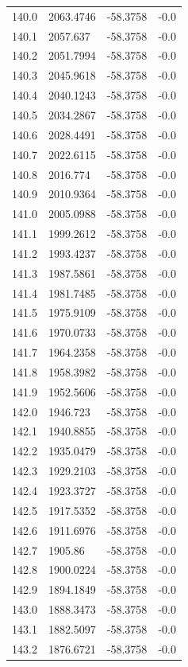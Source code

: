 \begin{table}[H]
\begin{tabular}{llll}
140.0 & 2063.4746 & -58.3758 & -0.0 \\
140.1 & 2057.637 & -58.3758 & -0.0 \\
140.2 & 2051.7994 & -58.3758 & -0.0 \\
140.3 & 2045.9618 & -58.3758 & -0.0 \\
140.4 & 2040.1243 & -58.3758 & -0.0 \\
140.5 & 2034.2867 & -58.3758 & -0.0 \\
140.6 & 2028.4491 & -58.3758 & -0.0 \\
140.7 & 2022.6115 & -58.3758 & -0.0 \\
140.8 & 2016.774 & -58.3758 & -0.0 \\
140.9 & 2010.9364 & -58.3758 & -0.0 \\
141.0 & 2005.0988 & -58.3758 & -0.0 \\
141.1 & 1999.2612 & -58.3758 & -0.0 \\
141.2 & 1993.4237 & -58.3758 & -0.0 \\
141.3 & 1987.5861 & -58.3758 & -0.0 \\
141.4 & 1981.7485 & -58.3758 & -0.0 \\
141.5 & 1975.9109 & -58.3758 & -0.0 \\
141.6 & 1970.0733 & -58.3758 & -0.0 \\
141.7 & 1964.2358 & -58.3758 & -0.0 \\
141.8 & 1958.3982 & -58.3758 & -0.0 \\
141.9 & 1952.5606 & -58.3758 & -0.0 \\
142.0 & 1946.723 & -58.3758 & -0.0 \\
142.1 & 1940.8855 & -58.3758 & -0.0 \\
142.2 & 1935.0479 & -58.3758 & -0.0 \\
142.3 & 1929.2103 & -58.3758 & -0.0 \\
142.4 & 1923.3727 & -58.3758 & -0.0 \\
142.5 & 1917.5352 & -58.3758 & -0.0 \\
142.6 & 1911.6976 & -58.3758 & -0.0 \\
142.7 & 1905.86 & -58.3758 & -0.0 \\
142.8 & 1900.0224 & -58.3758 & -0.0 \\
142.9 & 1894.1849 & -58.3758 & -0.0 \\
143.0 & 1888.3473 & -58.3758 & -0.0 \\
143.1 & 1882.5097 & -58.3758 & -0.0 \\
143.2 & 1876.6721 & -58.3758 & -0.0 \\

\end{tabular}
\end{table}
